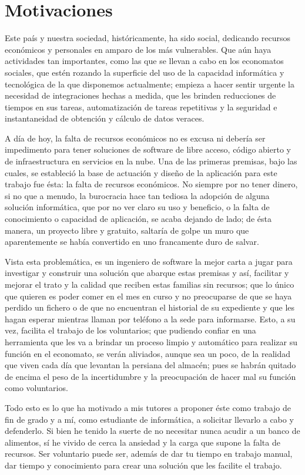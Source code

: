 \section{Motivaciones}
Este país y nuestra sociedad, históricamente, ha sido social, dedicando recursos económicos y personales en amparo de los más vulnerables. Que aún haya actividades tan importantes, como las que se llevan a cabo en los economatos sociales, que estén rozando la superficie del uso de la capacidad informática y tecnológica de la que disponemos actualmente; empieza a hacer sentir urgente la necesidad de integraciones hechas a medida, que les brinden reducciones de tiempos en sus tareas, automatización de tareas repetitivas y la seguridad e instantaneidad de obtención y cálculo de datos veraces.
\vspace{1em}
\par A día de hoy, la falta de recursos económicos no es excusa ni debería ser impedimento para tener soluciones de software de libre acceso, código abierto y de infraestructura en servicios en la nube. Una de las primeras premisas, bajo las cuales, se estableció la base de actuación y diseño de la aplicación para este trabajo fue ésta: la falta de recursos económicos. No siempre por no tener dinero, si no que a menudo, la burocracia hace tan tediosa la adopción de alguna solución informática, que por no ver claro su uso y beneficio, o la falta de conocimiento o capacidad de
aplicación, se acaba dejando de lado; de ésta manera, un proyecto libre y gratuito, saltaría de golpe un muro que aparentemente se había convertido en uno francamente duro de salvar.
\vspace{1em}
\par Vista esta problemática, es un ingeniero de software la mejor carta a jugar para investigar y construir una solución que abarque estas premisas y así, facilitar y mejorar el trato y la calidad que reciben estas familias sin recursos; que lo único que quieren es poder comer en el mes en curso y no preocuparse de que se haya perdido un fichero o de que no encuentran el historial de su expediente y que les hagan esperar mientras llaman por teléfono a la sede para informarse.
Esto, a su vez, facilita el trabajo de los voluntarios; que pudiendo confiar en una herramienta que les va a brindar un proceso limpio y automático para realizar su función en el economato, se verán aliviados, aunque sea un poco, de la realidad que viven cada día que levantan la persiana del almacén; pues se habrán quitado de encima el peso de la incertidumbre y la preocupación de hacer mal
su función como voluntarios.
\vspace{1em}
\par Todo esto es lo que ha motivado a mis tutores a proponer éste como trabajo de fin de grado y a mí, como estudiante de informática, a solicitar llevarlo a cabo y defenderlo. Si bien he tenido la suerte de no necesitar nunca acudir a un banco de alimentos, sí he vivido de cerca la ansiedad y la carga que supone la falta de recursos. Ser voluntario puede ser, además de dar tu tiempo en trabajo manual, dar tiempo y conocimiento para crear una solución que les facilite el trabajo.


